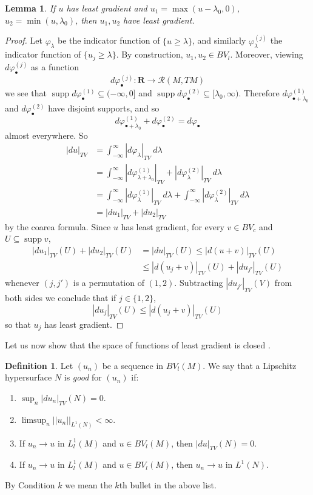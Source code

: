 \documentclass[reqno,12pt,letterpaper]{amsart}
\newcommand{\RR}{\mathbf{R}}
\DeclareMathOperator{\supp}{supp}
\newcommand{\dfn}[1]{\emph{#1}\index{#1}}
\newtheorem{lemma}[theorem]{Lemma}
\theoremstyle{definition}
\newtheorem{definition}[theorem]{Definition}
\numberwithin{equation}{section}
\begin{document}
\begin{lemma}\label{least gradient splitting}
If $u$ has least gradient and $u_1 = \max(u - \lambda_0, 0)$, $u_2 = \min(u, \lambda_0)$, then $u_1,u_2$ have least gradient.
\end{lemma}
\begin{proof}
Let $\varphi_\lambda$ be the indicator function of $\{u \geq \lambda\}$, and similarly $\varphi_\lambda^{(j)}$ the indicator function of $\{u_j \geq \lambda\}$.
By construction, $u_1,u_2 \in BV_l$.
Moreover, viewing $d \varphi_\bullet^{(j)}$ as a function
$$d \varphi_\bullet^{(j)}: \RR \to \mathcal R(M, TM)$$
we see that $\supp d \varphi_\bullet^{(1)} \subseteq (-\infty, 0]$ and $\supp d \varphi_\bullet^{(2)} \subseteq [\lambda_0, \infty)$.
Therefore $d \varphi_{\bullet + \lambda_0}^{(1)}$ and $d \varphi_\bullet^{(2)}$ have disjoint supports, and so
$$d \varphi_{\bullet + \lambda_0}^{(1)} + d \varphi_\bullet^{(2)} = d \varphi_\bullet$$
almost everywhere.
So
\begin{align*}
|d u|_{TV}
&=\int_{-\infty}^\infty |d \varphi_\lambda|_{TV} ~d\lambda\\
&= \int_{-\infty}^\infty |d \varphi_{\lambda+\lambda_0}^{(1)}|_{TV} + |d \varphi_\lambda^{(2)}|_{TV} ~d\lambda \\
&= \int_{-\infty}^\infty |d \varphi_\lambda^{(1)}|_{TV} ~d\lambda + \int_{-\infty}^\infty |d \varphi_\lambda^{(2)}|_{TV} ~d\lambda\\
&= |d u_1|_{TV} + |d u_2|_{TV}
\end{align*}
by the coarea formula. Since $u$ has least gradient, for every $v \in BV_c$ and $U \subseteq \supp v$,
\begin{align*}|d u_1|_{TV}(U) + |d u_2|_{TV}(U) &= |d u|_{TV}(U) \leq |d(u+v)|_{TV}(U) \\
&\leq |d(u_j + v)|_{TV}(U) + |d u_{j'}|_{TV}(U)
\end{align*}
whenever $(j,j')$ is a permutation of $(1,2)$.
Subtracting $|d u_{j'}|_{TV}(V)$ from both sides we conclude that if $j \in \{1, 2\}$,
$$|d u_j|_{TV}(U) \leq |d(u_j + v)|_{TV}(U)$$
so that $u_j$ has least gradient.
\end{proof}

Let us now show that the space of functions of least gradient is closed \cite[Teorema 3]{Miranda67}.

\begin{definition}
Let $(u_n)$ be a sequence in $BV_l(M)$. We say that a Lipschitz hypersurface $N$ is \dfn{good} for $(u_n)$ if:
\begin{enumerate}
\item \label{cond1Mir} $\sup_n |du_n|_{TV}(N) = 0$.
\item \label{cond2Mir} $\limsup_n ||u_n||_{L^1(N)} < \infty$.
\item \label{cond3Mir} If $u_n \to u$ in $L^1_l(M)$ and $u \in BV_l(M)$, then $|du|_{TV}(N) = 0$.
\item \label{cond4Mir} If $u_n \to u$ in $L^1_l(M)$ and $u \in BV_l(M)$, then $u_n \to u$ in $L^1(N)$.
\end{enumerate}
By Condition $k$ we mean the $k$th bullet in the above list.
\end{definition}
\end{document}
